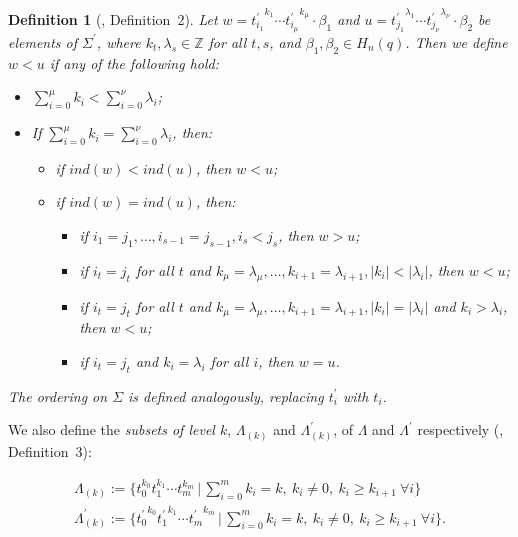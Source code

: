 \documentclass[11pt]{amsart}
\newtheorem{defn}{Definition}
\begin{document}
\begin{defn}[\cite{DL2}, Definition~2] \label{order} \rm
Let \(w={t^{\prime}_{i_1}}^{k_1}\cdots {t^{\prime}_{i_{\mu}}}^{k_{\mu}} \cdot \beta_1\) and \(u={t^{\prime}_{j_1}}^{\lambda_1}\cdots {t^{\prime}_{j_{\nu}}}^{\lambda_{\nu}} \cdot \beta_2\) be elements of \(\Sigma^{\prime}\), where \(k_t, \lambda_s \in \mathbb{Z}\) for all \(t,s\), and \(\beta_1, \beta_2 \in H_n(q)\). Then we define \(w < u\) if any of the following hold:

\begin{itemize}
\item[(a)] \(\sum_{i=0}^{\mu} k_i < \sum_{i=0}^{\nu} \lambda_i\);

\item[(b)] If \(\sum_{i=0}^{\mu} k_i = \sum_{i=0}^{\nu} \lambda_i\), then:
\begin{itemize}
\item[(i)] if \(ind(w) < ind(u)\), then \(w < u\);
\item[(ii)] if \(ind(w) = ind(u)\), then:
\begin{itemize}
\item[($\alpha$)] if \(i_1=j_1, \ldots, i_{s-1}=j_{s-1}, i_s<j_s\), then \(w>u\);
\item[($\beta$)] if \(i_t=j_t\) for all \(t\) and \(k_{\mu}=\lambda_{\mu}, \ldots, k_{i+1}=\lambda_{i+1}, |k_i|<|\lambda_i|\), then \(w<u\);
\item[($\gamma$)] if \(i_t=j_t\) for all \(t\) and \(k_{\mu}=\lambda_{\mu}, \ldots, k_{i+1}=\lambda_{i+1}, |k_i|=|\lambda_i|\) and \(k_i>\lambda_i\), then \(w<u\);
\item[($\delta$)] if \(i_t=j_t\) and \(k_i=\lambda_i\) for all \(i\), then \(w=u\).
\end{itemize}
\end{itemize}
\end{itemize}

The ordering on \(\Sigma\) is defined analogously, replacing \(t_i^{\prime}\) with \(t_i\).
\end{defn}

\bigbreak

We also define the \textit{subsets of level \(k\)}, \(\Lambda_{(k)}\) and \(\Lambda^{\prime}_{(k)}\), of \(\Lambda\) and \(\Lambda^{\prime}\) respectively (\cite{DL2}, Definition~3):

\begin{equation}
\begin{array}{l}
\Lambda_{(k)} := \bigl\{t_0^{k_0} t_1^{k_1} \cdots t_m^{k_m} \,\big|\, \sum_{i=0}^m k_i = k,\ k_i \neq 0,\ k_i \geq k_{i+1} \ \forall i \bigr\} \\[1ex]
\Lambda^{\prime}_{(k)} := \bigl\{{t^{\prime}_0}^{k_0} {t^{\prime}_1}^{k_1} \cdots {t^{\prime}_m}^{k_m} \,\big|\, \sum_{i=0}^m k_i = k,\ k_i \neq 0,\ k_i \geq k_{i+1} \ \forall i \bigr\}.
\end{array}
\end{equation}
\end{document}
